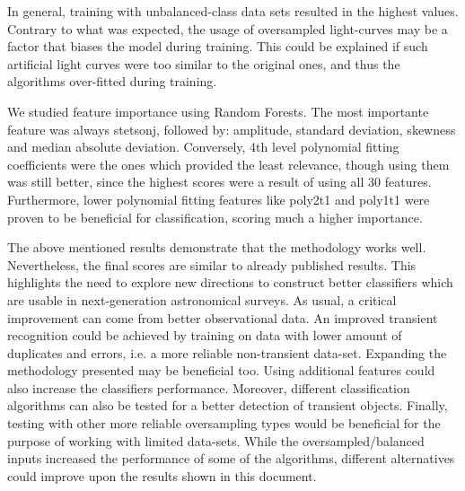 \documentclass[a4paper,fleqn,usenatbib]{mnras}
\begin{document}
In general, training with unbalanced-class data sets resulted in the
highest values. 
Contrary to what was expected, the usage of oversampled light-curves
may be a factor that biases the model during training. 
This could be explained if such artificial light curves were too
similar to the original ones, and thus the algorithms over-fitted
during training.  

We studied feature importance using Random Forests. 
The most importante feature was always stetson\textunderscore j, followed by:
amplitude, standard deviation, skewness and median absolute
deviation. 
Conversely, 4th level polynomial fitting coefficients were
the ones which provided the least relevance, though using them was
still better, since the highest scores were a result of using all 30
features. 
Furthermore, lower polynomial fitting features like
poly2\textunderscore t1 and poly1\textunderscore t1 were proven to be
beneficial for classification, scoring much a higher importance. 

The above mentioned results demonstrate that the methodology works well.
Nevertheless, the final scores are similar to already published results.
This highlights the need to explore new directions to construct better
classifiers which are usable in next-generation astronomical surveys.   
As usual, a critical improvement can come from better observational
data.
An improved transient recognition could be achieved by training on
data with lower  amount of duplicates and errors, i.e. a more reliable
non-transient data-set.    
Expanding the methodology presented may be beneficial too. 
Using additional features could also increase the classifiers
performance. 
Moreover, different classification algorithms can also be tested for a
better detection of transient objects.  
Finally, testing with other more reliable oversampling types would be
beneficial for the purpose of working with limited data-sets. 
While the oversampled/balanced inputs increased the performance of some of
the algorithms, different alternatives could improve upon the results
shown in this document. 




\end{document}
